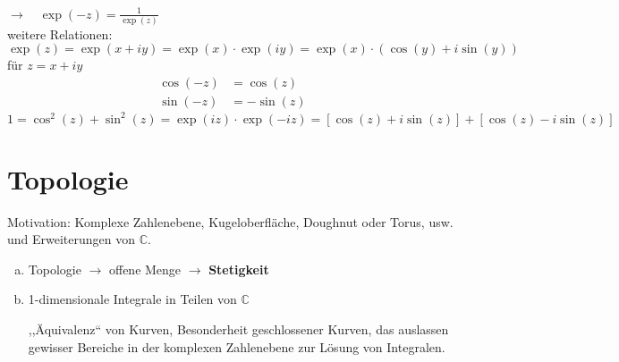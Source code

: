\begin{enumerate}[a)]
	$ \rightarrow \quad \exp(-z) = \frac{1}{\exp(z)} $\\[10pt]
	weitere Relationen:
	\begin{equation*}
	\exp(z) = \exp(x + i y) = \exp(x) \cdot \exp(iy) = \exp(x) \cdot (\cos(y) + i \sin(y))
	\end{equation*}
	für $ z = x + i y $
	\begin{align*}
	\cos(-z) &= \cos(z) \\
	\sin(-z) &= - \sin(z)
	\end{align*}
	\begin{equation*}
	1 = \cos^2(z) + \sin^2(z) = \exp(iz) \cdot \exp(-iz) = \left[\cos(z) + i \sin(z)\right] + \left[\cos(z) - i \sin(z)\right]
	\end{equation*}
\end{enumerate}

\section{Topologie}

Motivation: Komplexe Zahlenebene, Kugeloberfläche, Doughnut oder Torus, usw. und Erweiterungen von $ \mathbb{C} $.
\begin{enumerate}[a)]
	\item Topologie $ \rightarrow $ offene Menge $ \rightarrow $ \textbf{Stetigkeit}
	\item 1-dimensionale Integrale in Teilen von $ \mathbb{C} $
	
	
	\hft
	
	
	\noindent
	,,Äquivalenz`` von Kurven, Besonderheit geschlossener Kurven, das auslassen gewisser Bereiche in der komplexen Zahlenebene zur Lösung von Integralen.
\end{enumerate}


